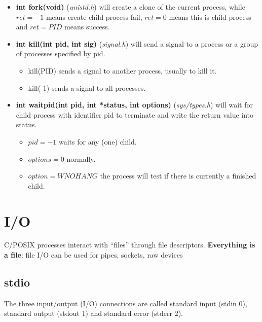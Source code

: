 \documentclass{article}
\begin{document}
\begin{itemize}
    \item \textbf{int fork(void)} (\textit{unistd.h}) will create a clone of the current process, while $ret = -1$ means create child process fail, $ret = 0$ means this is child process and $ret = PID$ means success.
    \item \textbf{int kill(int pid, int sig)} (\textit{signal.h}) will send a signal to a process or a group of processes specified by pid.
    \begin{itemize}
        \item kill(PID) sends a signal to another process, usually to kill it.
        \item kill(-1) sends a signal to all processes.
    \end{itemize}
    \item \textbf{int waitpid(int pid, int *status, int options)} (\textit{sys/types.h}) will wait for child process with identifier pid to terminate and write the return value into status.
    \begin{itemize}
        \item $pid=-1$ waits for any (one) child.
        \item $options=0$ normally.
        \item $option=WNOHANG$ the process will test if there is currently a finished child.
    \end{itemize}
\end{itemize}



\section{I/O}

C/POSIX processes interact with “files” through file descriptors. \textbf{Everything is a file}: file I/O can be used for pipes, sockets, raw devices

\subsection{stdio}

The three input/output (I/O) connections are called standard input (stdin 0), standard output (stdout 1) and standard error (stderr 2).
\end{document}
